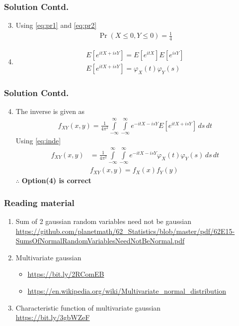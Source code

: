 \documentclass{beamer}
\providecommand{\pr}[1]{\ensuremath{\Pr\left(#1\right)}}
\providecommand{\sbrak}[1]{\ensuremath{{}\left[#1\right]}}
\begin{document}
\begin{frame}
 \frametitle{Solution Contd.}
\begin{enumerate}
\setcounter{enumi}{2}
\item
Using \eqref{eq:pr1} and \eqref{eq:pr2}
\begin{align}
\pr{X\le 0, Y\le0}=\frac{1}{4}
\end{align}
\item
\begin{align}
E\sbrak{e^{itX+isY}}=E\sbrak{e^{itX}}E\sbrak{e^{isY}}\\
E\sbrak{e^{itX+isY}}=\varphi_X(t)\varphi_Y(s) \label{eq:inde}
\end{align}
\end{enumerate}
\end{frame}

\begin{frame}
 \frametitle{Solution Contd.}
\begin{enumerate}\setcounter{enumi}{3}
\item
The inverse is given as
\begin{align}
f_{XY}(x,y)=\frac{1}{4\pi^2}\displaystyle \int\limits_{-\infty}^{\infty} \int\limits_{-\infty}^{\infty} e^{-itX-isY}E\sbrak{e^{itX+isY}}\,ds\,dt
\end{align}
Using \eqref{eq:inde}
\begin{align}
f_{XY}(x,y)&=\frac{1}{4\pi^2}\displaystyle \int\limits_{-\infty}^{\infty} \int\limits_{-\infty}^{\infty} e^{-itX-isY}\varphi_X(t)\varphi_Y(s)\,ds\,dt\\
&f_{XY}(x,y)=f_X(x)f_Y(y)
\end{align}
$\therefore$ \textbf{Option(4) is correct}
\end{enumerate}
\end{frame}

\begin{frame}
\frametitle{Reading material}
\begin{enumerate}
\item Sum of 2 gaussian random variables need not be gaussian\\
\url{https://github.com/planetmath/62_Statistics/blob/master/pdf/62E15-SumsOfNormalRandomVariablesNeedNotBeNormal.pdf}
\item Multivariate gaussian\\
\begin{itemize}
\item\url{https://bit.ly/2RComEB}\\
\item\url{https://en.wikipedia.org/wiki/Multivariate_normal_distribution}
\end{itemize}
\item Characteristic function of multivariate gaussian\\
\url{https://bit.ly/3gbWZeF}
\end{enumerate}
\end{frame}
\end{document}
